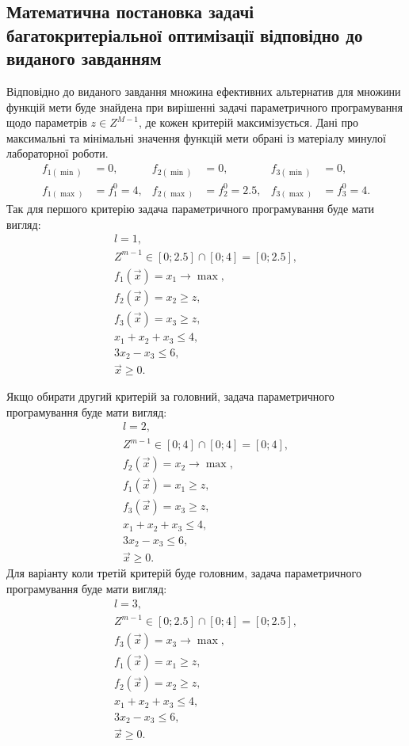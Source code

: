 \subsection{Математична постановка задачі багатокритеріальної оптимізації відповідно до виданого завданням}

Відповідно до виданого завдання множина ефективних альтернатив для множини функцій мети буде знайдена при вирішенні задачі параметричного програмування щодо параметрів $z \in Z^{M-1}$, де кожен критерій максимізується.
Дані про максимальні та мінімальні значення функцій мети обрані із матеріалу минулої лабораторної роботи.
\begin{align*}
    f_{1(\min)}&=0, &   f_{2(\min)}&=0, &   f_{3(\min)}&=0, \\
    f_{1(\max)}&=f_1^0=4,   &   f_{2(\max)}&=f_2^0=2.5, &   f_{3(\max)}&=f_3^0=4.
\end{align*} 
\clearpage
Так для першого критерію задача параметричного програмування буде мати вигляд:
\begin{gather*} 
    l = 1, \\
    Z^{m-1} \in [0; 2.5] \cap [0; 4] = [0; 2.5], \\
    f_1 (\vec{x}) = x_1 \to \max, \\
    f_2 (\vec{x}) = x_2 \geqslant z,  \\
    f_3 (\vec{x}) = x_3 \geqslant z,  \\
    x_1 + x_2 + x_3 \leqslant 4, \\
    3 x_2 - x_3 \leqslant 6, \\
    \vec{x} \geqslant 0.
\end{gather*}

Якщо обирати другий критерій за головний, задача параметричного програмування буде мати вигляд:
\begin{gather*} 
    l = 2, \\
    Z^{m-1} \in [0; 4] \cap [0; 4] = [0; 4], \\
    f_2 (\vec{x}) = x_2 \to \max, \\
    f_1 (\vec{x}) = x_1 \geqslant z,  \\
    f_3 (\vec{x}) = x_3 \geqslant z,  \\
    x_1 + x_2 + x_3 \leqslant 4, \\
    3 x_2 - x_3 \leqslant 6, \\
    \vec{x} \geqslant 0.
\end{gather*}
\clearpage
Для варіанту коли третій критерій буде головним, задача параметричного програмування буде мати вигляд:
\begin{gather*}
    l = 3, \\ 
    Z^{m-1} \in [0; 2.5] \cap [0; 4] = [0; 2.5], \\
    f_3 (\vec{x}) = x_3 \to \max, \\
    f_1 (\vec{x}) = x_1 \geqslant z,  \\
    f_2 (\vec{x}) = x_2 \geqslant z,  \\
    x_1 + x_2 + x_3 \leqslant 4, \\
    3 x_2 - x_3 \leqslant 6, \\
    \vec{x} \geqslant 0.
\end{gather*}

